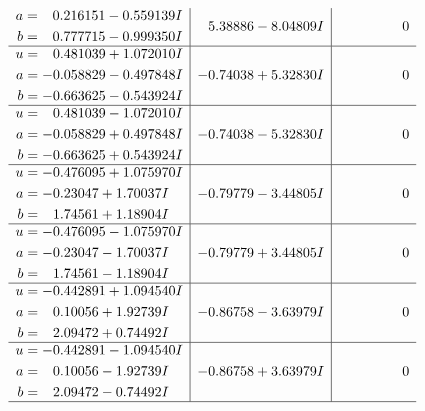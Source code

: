 \documentclass[1p]{elsarticle_modified}
\theoremstyle{definition}
\begin{document}
$$\begin{array}{c|c|c}
\begin{aligned}
a &= \phantom{-}0.216151 - 0.559139 I \\
b &= \phantom{-}0.777715 - 0.999350 I\end{aligned}
 & \phantom{-}5.38886 - 8.04809 I & \phantom{-0.000000 } 0 \\ \hline\begin{aligned}
u &= \phantom{-}0.481039 + 1.072010 I \\
a &= -0.058829 - 0.497848 I \\
b &= -0.663625 - 0.543924 I\end{aligned}
 & -0.74038 + 5.32830 I & \phantom{-0.000000 } 0 \\ \hline\begin{aligned}
u &= \phantom{-}0.481039 - 1.072010 I \\
a &= -0.058829 + 0.497848 I \\
b &= -0.663625 + 0.543924 I\end{aligned}
 & -0.74038 - 5.32830 I & \phantom{-0.000000 } 0 \\ \hline\begin{aligned}
u &= -0.476095 + 1.075970 I \\
a &= -0.23047 + 1.70037 I \\
b &= \phantom{-}1.74561 + 1.18904 I\end{aligned}
 & -0.79779 - 3.44805 I & \phantom{-0.000000 } 0 \\ \hline\begin{aligned}
u &= -0.476095 - 1.075970 I \\
a &= -0.23047 - 1.70037 I \\
b &= \phantom{-}1.74561 - 1.18904 I\end{aligned}
 & -0.79779 + 3.44805 I & \phantom{-0.000000 } 0 \\ \hline\begin{aligned}
u &= -0.442891 + 1.094540 I \\
a &= \phantom{-}0.10056 + 1.92739 I \\
b &= \phantom{-}2.09472 + 0.74492 I\end{aligned}
 & -0.86758 - 3.63979 I & \phantom{-0.000000 } 0 \\ \hline\begin{aligned}
u &= -0.442891 - 1.094540 I \\
a &= \phantom{-}0.10056 - 1.92739 I \\
b &= \phantom{-}2.09472 - 0.74492 I\end{aligned}
 & -0.86758 + 3.63979 I & \phantom{-0.000000 } 0\\
 \hline 

\end{array}$$
\end{document}
